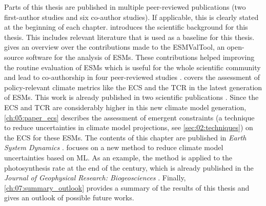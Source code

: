 Parts of this thesis are published in multiple peer-reviewed publications (two
first-author studies and six co-author studies). If applicable, this is clearly
stated at the beginning of each chapter. 
introduces the scientific background for this thesis. This includes relevant
literature that is used as a baseline for this thesis. 
gives an overview over the contributions made to the \ac{ESMValTool}, an
open-source software for the analysis of \acp{ESM}. These contributions helped
improving the routine evaluation of \acp{ESM} which is useful for the whole
scientific community and lead to co-authorship in four peer-reviewed studies
\autocite{Righi2020, Eyring2020, Lauer2020, Weigel2020}.
 covers the assessment of
policy-relevant climate metrics like the \ac{ECS} and the \ac{TCR} in the
latest generation of \acp{ESM}. This work is already published in two
scientific publications \autocite{Bock2020, Meehl2020}. Since the \ac{ECS} and
\ac{TCR} are considerably higher in this new climate model generation,
\cref{ch:05:paper_ecs} describes the assessment of emergent constraints (a
technique to reduce uncertainties in climate model projections, see
\vref{sec:02:techniques}) on the \ac{ECS} for these \acp{ESM}. The contents of
this chapter are published in \emph{Earth System Dynamics}
\autocite{Schlund2020a}.  focuses on a new method to
reduce climate model uncertainties based on \ac{ML}. As an example, the method
is applied to the photosynthesis rate at the end of the  century, which
is already published in the \emph{Journal of Geophysical Research:
  Biogeosciences} \autocite{Schlund2020}. Finally, \cref{ch:07:summary_outlook}
provides a summary of the results of this thesis and gives an outlook of
possible future works.